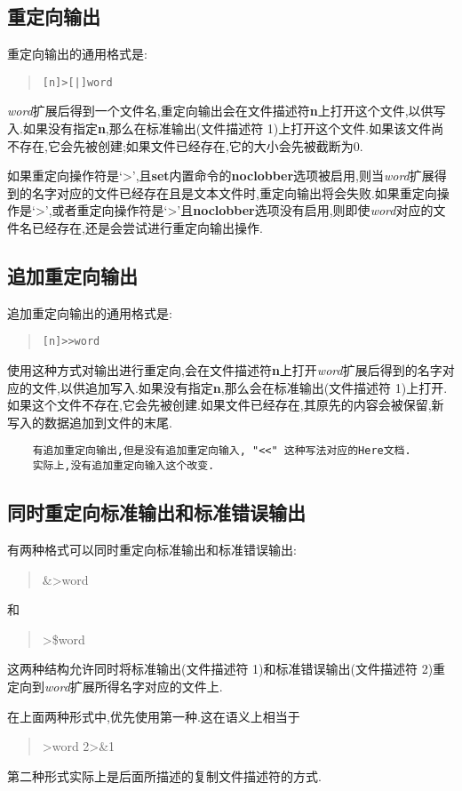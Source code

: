 \documentclass[draft,openany]{book}
\begin{document}
\begin{CJK}{UTF8}{gbsn}
    \subsection{重定向输出}
    重定向输出的通用格式是:
    \begin{quote}
        \verb+[n]>[|]word+
    \end{quote}
    \emph{word}扩展后得到一个文件名,重定向输出会在文件描述符\textbf{n}上打开这个文件,以供写入.如果没有指定\textbf{n},那么在标准输出(文件描述符 1)上打开这个文件.如果该文件尚不存在,它会先被创建;如果文件已经存在,它的大小会先被截断为0.\par
    如果重定向操作符是`\textgreater',且\textbf{set}内置命令的\textbf{noclobber}选项被启用,则当\emph{word}扩展得到的名字对应的文件已经存在且是文本文件时,重定向输出将会失败.如果重定向操作是`\textgreater\textbar',或者重定向操作符是`\textgreater'且\textbf{noclobber}选项没有启用,则即使\emph{word}对应的文件名已经存在,还是会尝试进行重定向输出操作.

    \subsection{追加重定向输出}
    追加重定向输出的通用格式是:
    \begin{quote}
        \verb+[n]>>word+
    \end{quote}
    使用这种方式对输出进行重定向,会在文件描述符\textbf{n}上打开\emph{word}扩展后得到的名字对应的文件,以供追加写入.如果没有指定\textbf{n},那么会在标准输出(文件描述符 1)上打开.如果这个文件不存在,它会先被创建.如果文件已经存在,其原先的内容会被保留,新写入的数据追加到文件的末尾.
    \begin{verbatim}
    有追加重定向输出,但是没有追加重定向输入, "<<" 这种写法对应的Here文档.
    实际上,没有追加重定向输入这个改变.
    \end{verbatim}

    \subsection{同时重定向标准输出和标准错误输出}
    有两种格式可以同时重定向标准输出和标准错误输出:
    \begin{quote}
        \&\textgreater{}word
    \end{quote}
    和
    \begin{quote}
        \textgreater\$word
    \end{quote}
    这两种结构允许同时将标准输出(文件描述符 1)和标准错误输出(文件描述符 2)重定向到\emph{word}扩展所得名字对应的文件上.\par
    在上面两种形式中,优先使用第一种.这在语义上相当于
    \begin{quote}
        \textgreater{}word 2\textgreater\&1
    \end{quote}
    第二种形式实际上是后面所描述的复制文件描述符的方式.


\end{CJK}
\end{document}
